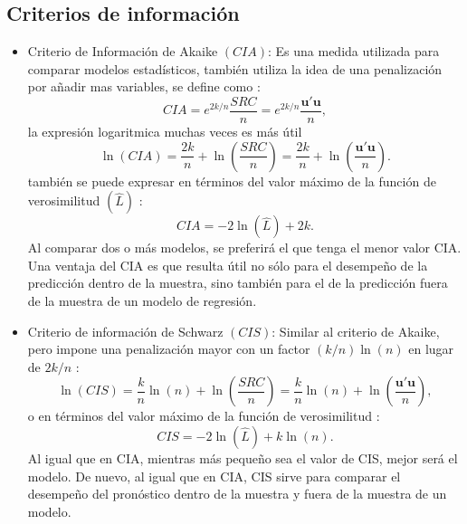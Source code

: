 \documentclass[12pt]{article}
\begin{document}
\subsection*{Criterios de información}
\begin{itemize}
    \item Criterio de Información de Akaike $(CIA)$: Es una medida utilizada para comparar modelos estadísticos, también utiliza
    la idea de una penalización por añadir mas variables, se define como \cite{gujarati_econometri_2015}:
    \begin{equation}
        CIA = e^{2k/n} \frac{SRC}{n} = e^{2k/n} \frac{\pmb{u'u}}{n},
        \label{eq:cia}
    \end{equation}
    la expresión logaritmica muchas veces es más útil
    \begin{equation}
        \ln(CIA) = \frac{2k}{n} + \ln\left(\frac{SRC}{n}\right) = \frac{2k}{n} + \ln\left(\frac{\pmb{u'u}}{n}\right).
        \label{eq:ln_cia}
    \end{equation}
    también se puede expresar en términos del valor máximo de la función de verosimilitud $(\hat{L})$ \cite{greene_econometric_2012}:
    \begin{equation}
        CIA = -2 \ln(\hat{L}) + 2k.
        \label{eq:cia_verosimilitud}
    \end{equation}
    Al comparar dos o más modelos, se preferirá el que tenga el menor valor CIA. 
    Una ventaja del CIA es que resulta útil no sólo para el desempeño de la predicción dentro de la muestra, 
    sino también para el de la predicción fuera de la muestra de un modelo de regresión. \cite{gujarati_econometri_2015}

    \item Criterio de información de Schwarz $(CIS)$: Similar al criterio de Akaike,
    pero impone una penalización mayor con un factor $(k/n)\ln(n)$ en lugar de $2k/n$ \cite{gujarati_econometri_2015}: 
    \begin{equation}
        \ln(CIS) = \frac{k}{n} \ln(n) + \ln\left(\frac{SRC}{n}\right) = \frac{k}{n} \ln(n) + \ln\left(\frac{\pmb{u'u}}{n}\right),
        \label{eq:cis}
    \end{equation}
    o en términos del valor máximo de la función de verosimilitud \cite{greene_econometric_2012}:
    \begin{equation}
        CIS = -2 \ln(\hat{L}) + k \ln(n).
        \label{eq:cis_verosimilitud}
    \end{equation}
    Al igual que en CIA, mientras más pequeño sea el valor de CIS, mejor será el modelo. 
    De nuevo, al igual que en CIA, CIS sirve para comparar el desempeño del pronóstico 
    dentro de la muestra y fuera de la muestra de un modelo.


\end{itemize}
\end{document}
